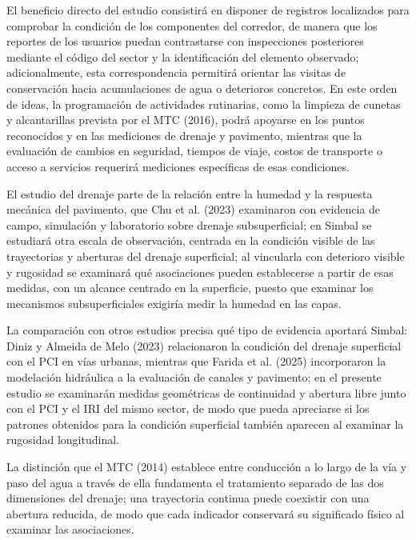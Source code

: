 El beneficio directo del estudio consistirá en disponer de registros localizados para comprobar la condición de los componentes del corredor, de manera que los reportes de los usuarios puedan contrastarse con inspecciones posteriores mediante el código del sector y la identificación del elemento observado; adicionalmente, esta correspondencia permitirá orientar las visitas de conservación hacia acumulaciones de agua o deterioros concretos. En este orden de ideas, la programación de actividades rutinarias, como la limpieza de cunetas y alcantarillas prevista por el MTC (2016), podrá apoyarse en los puntos reconocidos y en las mediciones de drenaje y pavimento, mientras que la evaluación de cambios en seguridad, tiempos de viaje, costos de transporte o acceso a servicios requerirá mediciones específicas de esas condiciones.


El estudio del drenaje parte de la relación entre la humedad y la respuesta mecánica del pavimento, que Chu et al. (2023) examinaron con evidencia de campo, simulación y laboratorio sobre drenaje subsuperficial; en Simbal se estudiará otra escala de observación, centrada en la condición visible de las trayectorias y aberturas del drenaje superficial; al vincularla con deterioro visible y rugosidad se examinará qué asociaciones pueden establecerse a partir de esas medidas, con un alcance centrado en la superficie, puesto que examinar los mecanismos subsuperficiales exigiría medir la humedad en las capas.

La comparación con otros estudios precisa qué tipo de evidencia aportará Simbal: Diniz y Almeida de Melo (2023) relacionaron la condición del drenaje superficial con el PCI en vías urbanas, mientras que Farida et al. (2025) incorporaron la modelación hidráulica a la evaluación de canales y pavimento; en el presente estudio se examinarán medidas geométricas de continuidad y abertura libre junto con el PCI y el IRI del mismo sector, de modo que pueda apreciarse si los patrones obtenidos para la condición superficial también aparecen al examinar la rugosidad longitudinal.

La distinción que el MTC (2014) establece entre conducción a lo largo de la vía y paso del agua a través de ella fundamenta el tratamiento separado de las dos dimensiones del drenaje; una trayectoria continua puede coexistir con una abertura reducida, de modo que cada indicador conservará su significado físico al examinar las asociaciones.

